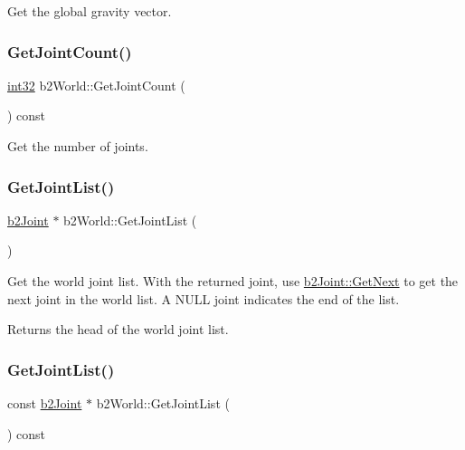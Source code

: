Get the global gravity vector. 

\mbox{\label{classb2_world_a98bd6ca53dbc376f210beced33901934}} 
\subsubsection{\texorpdfstring{GetJointCount()}{GetJointCount()}}
{\footnotesize\ttfamily \mbox{\hyperlink{b2_settings_8h_a43d43196463bde49cb067f5c20ab8481}{int32}} b2\+World\+::\+Get\+Joint\+Count (\begin{DoxyParamCaption}{ }\end{DoxyParamCaption}) const\hspace{0.3cm}{\ttfamily [inline]}}



Get the number of joints. 

\mbox{\label{classb2_world_a55db7240f8290aa02cab79f181934de8}} 
\subsubsection{\texorpdfstring{GetJointList()}{GetJointList()}\hspace{0.1cm}{\footnotesize\ttfamily [1/2]}}
{\footnotesize\ttfamily \mbox{\hyperlink{classb2_joint}{b2\+Joint}} $\ast$ b2\+World\+::\+Get\+Joint\+List (\begin{DoxyParamCaption}{ }\end{DoxyParamCaption})\hspace{0.3cm}{\ttfamily [inline]}}

Get the world joint list. With the returned joint, use \mbox{\hyperlink{classb2_joint_a1a0e2137b631010750c728cb4e276e5d}{b2\+Joint\+::\+Get\+Next}} to get the next joint in the world list. A N\+U\+LL joint indicates the end of the list. \begin{DoxyReturn}{Returns}
the head of the world joint list. 
\end{DoxyReturn}
\mbox{\label{classb2_world_af5f7feca7396ce10b905966a464177aa}} 
\subsubsection{\texorpdfstring{GetJointList()}{GetJointList()}\hspace{0.1cm}{\footnotesize\ttfamily [2/2]}}
{\footnotesize\ttfamily const \mbox{\hyperlink{classb2_joint}{b2\+Joint}} $\ast$ b2\+World\+::\+Get\+Joint\+List (\begin{DoxyParamCaption}{ }\end{DoxyParamCaption}) const\hspace{0.3cm}{\ttfamily [inline]}}

